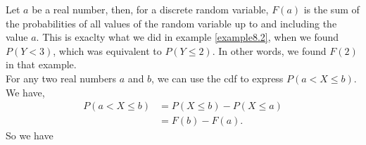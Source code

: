 \noindent Let $a$ be a real number, then, for a discrete random variable, $F(a)$ is the sum of the probabilities of all values of the random variable up to and including the value $a$. This is exaclty what we did in example \ref{example8.2}, when we found $P(Y < 3)$, which was equivalent to $P(Y \leq 2)$. In other words, we found $F(2)$ in that example. \\

\noindent For any two real numbers $a$ and $b$, we can use the cdf to express $P(a < X \leq b)$. We have,
\begin{align*}
P(a < X \leq b) & = P(X \leq b) - P(X \leq a) \\
		       & = F(b) - F(a).
\end{align*}
So we have

  	\bigskip
	
	\hfil{}
	\bigskip
	\bigskip



  	\bigskip
	
